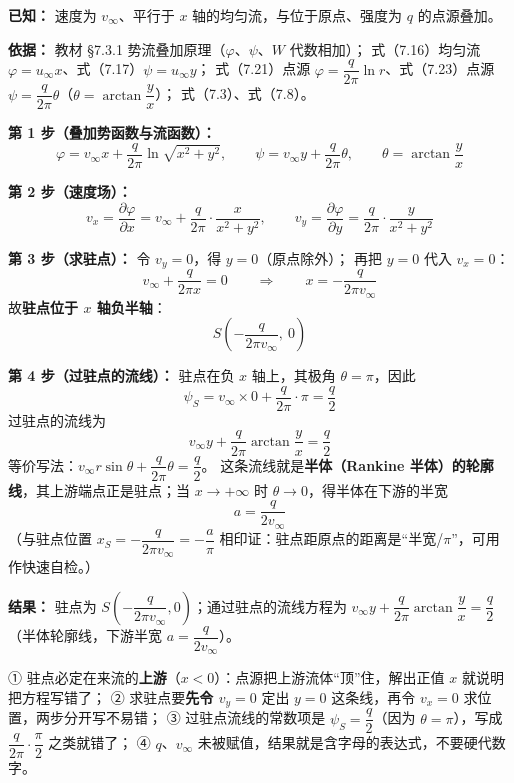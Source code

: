 \begin{jie}
\textbf{已知：} 速度为 $v_\infty$、平行于 $x$ 轴的均匀流，与位于原点、强度为 $q$ 的点源叠加。

\textbf{依据：} 教材 \S7.3.1 势流叠加原理（$\varphi$、$\psi$、$W$ 代数相加）；
式（7.16）均匀流 $\varphi=u_\infty x$、式（7.17）$\psi=u_\infty y$；
式（7.21）点源 $\varphi=\dfrac{q}{2\pi}\ln r$、式（7.23）点源 $\psi=\dfrac{q}{2\pi}\theta$（$\theta=\arctan\dfrac{y}{x}$）；
式（7.3）、式（7.8）。

\textbf{第 1 步（叠加势函数与流函数）：}
\[
\varphi=v_\infty x+\frac{q}{2\pi}\ln\sqrt{x^2+y^2},\qquad
\psi=v_\infty y+\frac{q}{2\pi}\theta,\qquad \theta=\arctan\frac{y}{x}
\]

\textbf{第 2 步（速度场）：}
\[
v_x=\frac{\partial\varphi}{\partial x}=v_\infty+\frac{q}{2\pi}\cdot\frac{x}{x^2+y^2},\qquad
v_y=\frac{\partial\varphi}{\partial y}=\frac{q}{2\pi}\cdot\frac{y}{x^2+y^2}
\]

\textbf{第 3 步（求驻点）：} 令 $v_y=0$，得 $y=0$（原点除外）；
再把 $y=0$ 代入 $v_x=0$：
\[
v_\infty+\frac{q}{2\pi x}=0\qquad\Longrightarrow\qquad x=-\frac{q}{2\pi v_\infty}
\]
故\textbf{驻点位于 $x$ 轴负半轴}：
\[
S\left(-\frac{q}{2\pi v_\infty},\ 0\right)
\]

\textbf{第 4 步（过驻点的流线）：} 驻点在负 $x$ 轴上，其极角 $\theta=\pi$，因此
\[
\psi_S=v_\infty\times 0+\frac{q}{2\pi}\cdot\pi=\frac{q}{2}
\]
过驻点的流线为
\[
\boxed{\,v_\infty y+\frac{q}{2\pi}\arctan\frac{y}{x}=\frac{q}{2}\,}
\]
等价写法：$v_\infty r\sin\theta+\dfrac{q}{2\pi}\theta=\dfrac{q}{2}$。
这条流线就是\textbf{半体（Rankine 半体）的轮廓线}，其上游端点正是驻点；当 $x\to+\infty$ 时 $\theta\to 0$，得半体在下游的半宽
\[
a=\frac{q}{2v_\infty}
\]
（与驻点位置 $x_S=-\dfrac{q}{2\pi v_\infty}=-\dfrac{a}{\pi}$ 相印证：驻点距原点的距离是“半宽/$\pi$”，可用作快速自检。）

\textbf{结果：} 驻点为 $S\left(-\dfrac{q}{2\pi v_\infty},0\right)$；通过驻点的流线方程为
$v_\infty y+\dfrac{q}{2\pi}\arctan\dfrac{y}{x}=\dfrac{q}{2}$（半体轮廓线，下游半宽 $a=\dfrac{q}{2v_\infty}$）。
\end{jie}

\begin{yicuo}
① 驻点必定在来流的\textbf{上游}（$x<0$）：点源把上游流体“顶”住，解出正值 $x$ 就说明把方程写错了；
② 求驻点要\textbf{先令 $v_y=0$} 定出 $y=0$ 这条线，再令 $v_x=0$ 求位置，两步分开写不易错；
③ 过驻点流线的常数项是 $\psi_S=\dfrac{q}{2}$（因为 $\theta=\pi$），写成 $\dfrac{q}{2\pi}\cdot\dfrac{\pi}{2}$ 之类就错了；
④ $q$、$v_\infty$ 未被赋值，结果就是含字母的表达式，不要硬代数字。
\end{yicuo}


